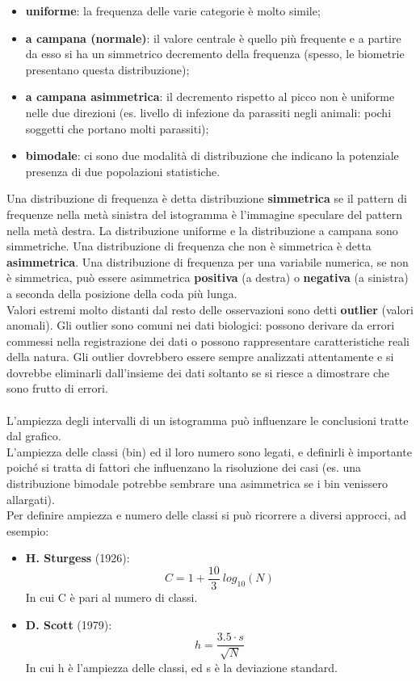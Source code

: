 \documentclass[10pt, draft]{book}
\newcommand{\tightlist}{%
\setlength{\itemsep}{1pt}\setlength{\parskip}{0pt}\setlength{\parsep}{0pt}}
\begin{document}
\begin{itemize} \tightlist
    \item \textbf{uniforme}: la frequenza delle varie categorie è molto simile;
    \item \textbf{a campana (normale)}: il valore centrale è quello più frequente e a partire da esso si ha un simmetrico decremento della frequenza (spesso, le biometrie presentano questa distribuzione);
    \item \textbf{a campana asimmetrica}: il decremento rispetto al picco non è uniforme nelle due direzioni (es. livello di infezione da parassiti negli animali: pochi soggetti che portano molti parassiti);
    \item \textbf{bimodale}: ci sono due modalità di distribuzione che indicano la potenziale presenza di due popolazioni statistiche.
\end{itemize}
Una distribuzione di frequenza è detta distribuzione \textbf{simmetrica} se il pattern di frequenze nella metà sinistra del istogramma è l'immagine speculare del pattern nella metà destra. La distribuzione uniforme e la distribuzione a campana sono simmetriche. Una distribuzione di frequenza che non è simmetrica è detta \textbf{asimmetrica}. Una distribuzione di frequenza per una variabile numerica, se non è simmetrica, può essere asimmetrica \textbf{positiva} (a destra) o \textbf{negativa} (a sinistra) a seconda della posizione della coda più lunga.
\\
Valori estremi molto distanti dal resto delle osservazioni sono detti \textbf{outlier} (valori anomali). Gli outlier sono comuni nei dati biologici: possono derivare da errori commessi nella registrazione dei dati o possono rappresentare caratteristiche reali della natura. Gli outlier dovrebbero essere sempre analizzati attentamente e si dovrebbe eliminarli dall'insieme dei dati soltanto se si riesce a dimostrare che sono frutto di errori.
\\
\\
L'ampiezza degli intervalli di un istogramma può influenzare le conclusioni tratte dal grafico.
\\
L'ampiezza delle classi (bin) ed il loro numero sono legati, e definirli è importante poiché si tratta di fattori che influenzano la risoluzione dei casi (es. una distribuzione bimodale potrebbe sembrare una asimmetrica se i bin venissero allargati).
\\
Per definire ampiezza e numero delle classi si può ricorrere a diversi approcci, ad esempio:
\begin{itemize} \tightlist
    \item \textbf{H. Sturgess} (1926):
    \begin{equation}
        C = 1 + \frac{10}{3}\ log_{10}(N)
    \end{equation}
    In cui C è pari al numero di classi.
    \item \textbf{D. Scott} (1979):
    \begin{equation}
        h = \frac{3.5 \cdot s}{\sqrt{N}}
    \end{equation}
    In cui h è l'ampiezza delle classi, ed s è la deviazione standard.
\end{itemize}
\end{document}
